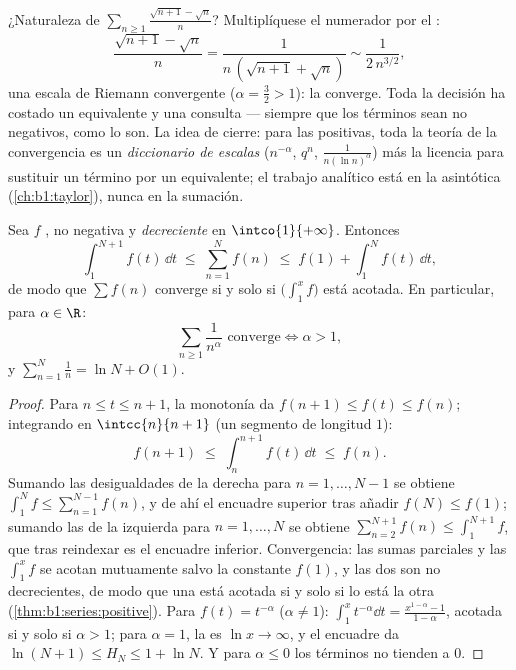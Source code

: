 \begin{example}\label{ex:b1:series:equivtest}
¿Naturaleza de $\sum_{n \geq 1} \frac{\sqrt{n+1} - \sqrt n}{n}$?
Multiplíquese el numerador por el :
\[
\frac{\sqrt{n+1} - \sqrt n}{n}
= \frac{1}{n\,(\sqrt{n+1} + \sqrt n)}
\sim \frac{1}{2\,n^{3/2}} ,
\]
una escala de Riemann convergente ($\alpha = \frac32 > 1$): la
 converge. Toda la decisión ha costado un equivalente y una
consulta --- siempre que los términos sean no negativos, como lo son.
La idea de cierre: para las  positivas, toda la teoría de la
convergencia es un \emph{diccionario de escalas} ($n^{-\alpha}$,
$q^n$, $\frac{1}{n(\ln n)^\alpha}$) más la licencia para sustituir un
término por un equivalente; el trabajo analítico está en la
asintótica (\cref{ch:b1:taylor}), nunca en la sumación.
\end{example}

\begin{theorem}\label{thm:b1:series:riemann}
Sea $f$ , no negativa y \emph{decreciente} en
$\intco{1}{+\infty}$. Entonces
\[
\int_1^{N+1} f(t)\,\dd t \;\leq\; \sum_{n=1}^{N} f(n) \;\leq\; f(1)
+ \int_1^{N} f(t)\,\dd t ,
\]
de modo que $\sum f(n)$ converge si y solo si $\bigl(\int_1^x f\bigr)$
está acotada. En particular, para $\alpha \in \R$:
\[
\sum_{n \geq 1} \frac{1}{n^\alpha} \text{ converge}
\iff \alpha > 1,
\]
y $\sum_{n=1}^{N} \frac1n = \ln N + O(1)$.
\end{theorem}

\begin{proof}
Para $n \leq t \leq n+1$, la monotonía da
$f(n+1) \leq f(t) \leq f(n)$; integrando en $\intcc{n}{n+1}$ (un
segmento de longitud $1$):
\[
f(n+1) \;\leq\; \int_n^{n+1} f(t)\,\dd t \;\leq\; f(n) .
\]
Sumando las desigualdades de la derecha para $n = 1, \dots, N-1$ se
obtiene $\int_1^{N} f \leq \sum_{n=1}^{N-1} f(n)$, y de ahí el
encuadre superior tras añadir $f(N) \leq f(1)$; sumando las de la
izquierda para $n = 1, \dots, N$ se obtiene
$\sum_{n=2}^{N+1} f(n) \leq \int_1^{N+1} f$, que tras reindexar es el
encuadre inferior. Convergencia: las sumas parciales y las
 $\int_1^x f$ se acotan mutuamente salvo la constante
$f(1)$, y las dos son no decrecientes, de modo que una está acotada
si y solo si lo está la otra (\cref{thm:b1:series:positive}). Para
$f(t) = t^{-\alpha}$ ($\alpha \neq 1$):
$\int_1^x t^{-\alpha}\dd t = \frac{x^{1-\alpha} - 1}{1 - \alpha}$,
acotada si y solo si $\alpha > 1$; para $\alpha = 1$, la  es
$\ln x \to \infty$, y el encuadre da $\ln(N+1) \leq H_N \leq 1 +
\ln N$. Y para $\alpha \leq 0$ los términos no tienden a $0$.
\end{proof}

